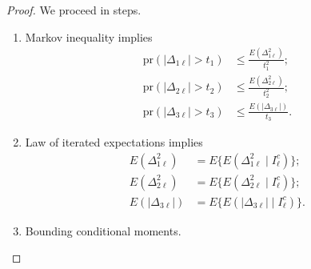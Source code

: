 \begin{proof}
We proceed in steps.
\begin{enumerate}
    \item Markov inequality implies
    \begin{align*}
        \text{pr}(|\Delta_{1\ell}|>t_1)&\leq \frac{E(\Delta^2_{1\ell})}{t_1^2};\\
        \text{pr}(|\Delta_{2\ell}|>t_2)&\leq \frac{E(\Delta^2_{2\ell})}{t_2^2}; \\
        \text{pr}(|\Delta_{3\ell}|>t_3)&\leq \frac{E(|\Delta_{3\ell}|)}{t_3}.
    \end{align*}
    \item Law of iterated expectations implies
    \begin{align*}
        E(\Delta^2_{1\ell})&=E\{E(\Delta^2_{1\ell}\mid I^c_{\ell})\};\\
        E(\Delta^2_{2\ell})&=E\{E(\Delta^2_{2\ell}\mid I^c_{\ell})\}; \\
        E(|\Delta_{3\ell}|)&=E\{E(|\Delta_{3\ell}|\mid I^c_{\ell})\}.
    \end{align*}
    \item Bounding conditional moments.
    

\end{enumerate}
\end{proof}
